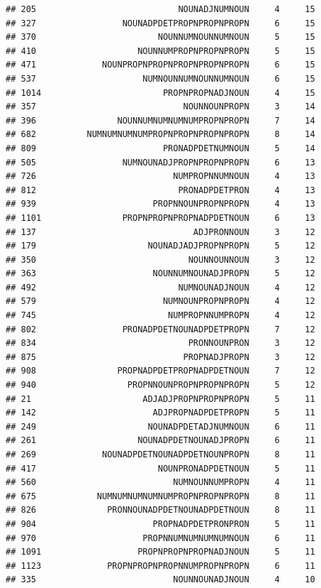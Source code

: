 \documentclass[]{article}
\begin{document}
\begin{verbatim}
## 205                            NOUNADJNUMNOUN     4     15
## 327                 NOUNADPDETPROPNPROPNPROPN     6     15
## 370                        NOUNNUMNOUNNUMNOUN     5     15
## 410                    NOUNNUMPROPNPROPNPROPN     5     15
## 471             NOUNPROPNPROPNPROPNPROPNPROPN     6     15
## 537                     NUMNOUNNUMNOUNNUMNOUN     6     15
## 1014                        PROPNPROPNADJNOUN     4     15
## 357                             NOUNNOUNPROPN     3     14
## 396                NOUNNUMNUMNUMNUMPROPNPROPN     7     14
## 682          NUMNUMNUMNUMPROPNPROPNPROPNPROPN     8     14
## 809                         PRONADPDETNUMNOUN     5     14
## 505                 NUMNOUNADJPROPNPROPNPROPN     6     13
## 726                           NUMPROPNNUMNOUN     4     13
## 812                            PRONADPDETPRON     4     13
## 939                       PROPNNOUNPROPNPROPN     4     13
## 1101                PROPNPROPNPROPNADPDETNOUN     6     13
## 137                               ADJPRONNOUN     3     12
## 179                      NOUNADJADJPROPNPROPN     5     12
## 350                              NOUNNOUNNOUN     3     12
## 363                       NOUNNUMNOUNADJPROPN     5     12
## 492                            NUMNOUNADJNOUN     4     12
## 579                         NUMNOUNPROPNPROPN     4     12
## 745                          NUMPROPNNUMPROPN     4     12
## 802                 PRONADPDETNOUNADPDETPROPN     7     12
## 834                              PRONNOUNPRON     3     12
## 875                             PROPNADJPROPN     3     12
## 908                PROPNADPDETPROPNADPDETNOUN     7     12
## 940                  PROPNNOUNPROPNPROPNPROPN     5     12
## 21                      ADJADJPROPNPROPNPROPN     5     11
## 142                       ADJPROPNADPDETPROPN     5     11
## 249                      NOUNADPDETADJNUMNOUN     6     11
## 261                    NOUNADPDETNOUNADJPROPN     6     11
## 269             NOUNADPDETNOUNADPDETNOUNPROPN     8     11
## 417                        NOUNPRONADPDETNOUN     5     11
## 560                           NUMNOUNNUMPROPN     4     11
## 675            NUMNUMNUMNUMNUMPROPNPROPNPROPN     8     11
## 826              PRONNOUNADPDETNOUNADPDETNOUN     8     11
## 904                       PROPNADPDETPRONPRON     5     11
## 970                     PROPNNUMNUMNUMNUMNOUN     6     11
## 1091                   PROPNPROPNPROPNADJNOUN     5     11
## 1123             PROPNPROPNPROPNNUMPROPNPROPN     6     11
## 335                           NOUNNOUNADJNOUN     4     10

\end{verbatim}
\end{document}
